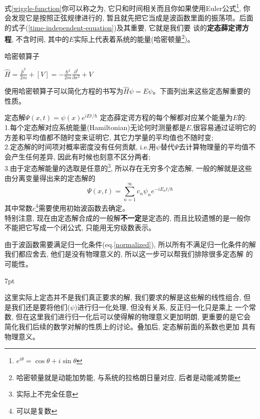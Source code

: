 \documentclass[a4paper,zihao=-4,linespread=1]{ctexrep}
\newenvironment{lequation}{\large\begin{equation}}{\end{equation}}
\newenvironment{thinknote}{%
\def\FrameCommand{%
\hspace{1pt}%
{\color{BurlyWood}\vrule width 2pt}%
{\color{formalshade}\vrule width 4pt}%
\colorbox{formalshade}%
}%
\MakeFramed{\advance\hsize-\width\FrameRestore}%
\noindent\hspace{-4.55pt}%
\begin{adjustwidth}{}{7pt}%
\vspace{2pt}\vspace{2pt}%
}
{%
\vspace{2pt}\end{adjustwidth}\endMakeFramed%
}
\begin{document}
    式\ref{wiggle-function}你可以称之为, 它只和时间相关而且你如果使用Euler公式\footnote[2]{$e^{i\theta}=\cos\theta+i\sin\theta$}, 你
    会发现它是按照正弦规律进行的, 暂且就先把它当成是波函数里面的振荡项。后面的式子(\ref{time-independent-equation})及其重要, 它就是我们要
    谈的\textbf{定态薛定谔方程}, 不含时间, 其中的$E$实际上代表着系统的能量(哈密顿量\footnote[3]{哈密顿量就是动能加势能, 与系统的拉格朗日量对应, 后者是动能减势能})。
    \begin{define}{哈密顿算子}
        \begin{center}
           \begin{math}
            \displaystyle
            \hat{H}=\frac{\hat{p}^2}{2m}+[V]=-\frac{\hbar^2}{2m}\frac{\partial^2}{\partial x^2}+V
        \end{math} 
        \end{center}
    \end{define}
    使用哈密顿算子可以简化方程的书写为$\hat{H}\psi=E\psi$。下面列出来这些定态解重要的性质。
    \begin{theorem}{定态解$\Psi(x,t)=\psi(x)e^{iEt/\hbar}$}
        定态薛定谔方程的每个解都对应某个能量为$E$的:\\
        1.每个定态解对应系统能量(Hamiltonian)无论何时测量都是$E$,很容易通过证明它的方差和平均值都不随时变来证明它, 其它力学量的平均值也不随时变;\\
        2.定态解的时间项对概率密度没有任何贡献, i.e.用$\psi$替代$\Psi$去计算物理量的平均值不会产生任何差异, 因此有时候也刻意不区分两者;\\
        3.由于定态解能量的选取是任意的\footnote{实际上不完全任意}, 所以存在无穷多个定态解, 一般的解就是这些由分离变量得出来的定态解的
        \begin{lequation}
            \label{find_c}
            \boxed{
                \Psi(x,t)=\sum_{n=1}^{\infty}c_n\psi_n e^{-iE_nt/\hbar}
            }
        \end{lequation}
        其中常数$c$\footnote{可以是复数}需要使用初始波函数去确定。\\
        特别注意, 现在由定态解合成的一般解\textbf{不一定}是定态的, 而且比较遗憾的是一般你不能把它写成一个闭公式, 只能用无穷级数表示。
    \end{theorem}
    由于波函数需要满足归一化条件(eq.\ref{normalized}), 所以所有不满足归一化条件的解我们都应舍去, 他们是没有物理意义的, 所以这一步可以帮我们排除很多定态解
    的可能性。
    \begin{thinknote}
        这里实际上定态并不是我们真正要求的解, 我们要求的解是这些解的线性组合, 但是我们还是要将他们($\psi$)进行归一化处理, 但没有关系, 反正归一化只是乘上
        一个常数, 但在这里我们进行归一化后可以使得解的物理意义更加明朗, 更重要的是它会简化我们后续的数学对解的性质上的讨论。叠加后, 定态解前面的系数也更加
        具有物理意义。
    \end{thinknote}
\end{document}

